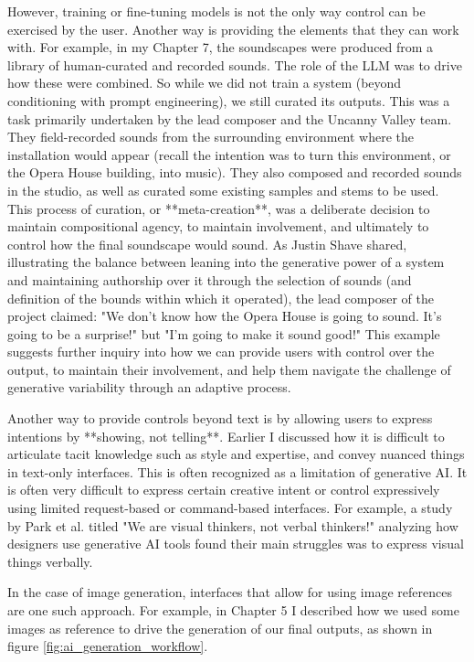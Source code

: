 However, training or fine-tuning models is not the only way control can be exercised by the user. Another way is providing the elements that they can work with. For example, in my Chapter 7, the soundscapes were produced from a library of human-curated and recorded sounds. The role of the LLM was to drive how these were combined. So while we did not train a system (beyond conditioning with prompt engineering), we still curated its outputs. This was a task primarily undertaken by the lead composer and the Uncanny Valley team. They field-recorded sounds from the surrounding environment where the installation would appear (recall the intention was to turn this environment, or the Opera House building, into music). They also composed and recorded sounds in the studio, as well as curated some existing samples and stems to be used. This process of curation, or **meta-creation**, was a deliberate decision to maintain compositional agency, to maintain involvement, and ultimately to control how the final soundscape would sound. As Justin Shave shared, illustrating the balance between leaning into the generative power of a system and maintaining authorship over it through the selection of sounds (and definition of the bounds within which it operated), the lead composer of the project claimed: "We don't know how the Opera House is going to sound. It's going to be a surprise!" but "I'm going to make it sound good!" This example suggests further inquiry into how we can provide users with control over the output, to maintain their involvement, and help them navigate the challenge of generative variability through an adaptive process.

Another way to provide controls beyond text is by allowing users to express intentions by **showing, not telling**. Earlier I discussed how it is difficult to articulate tacit knowledge such as style and expertise, and convey nuanced things in text-only interfaces. This is often recognized as a limitation of generative AI. It is often very difficult to express certain creative intent or control expressively using limited request-based or command-based interfaces. For example, a study by Park et al. \cite{Park2024-gw} titled "We are visual thinkers, not verbal thinkers!" analyzing how designers use generative AI tools found their main struggles was to express visual things verbally.

In the case of image generation, interfaces that allow for using image references are one such approach. For example, in Chapter 5 I described how we used some images as reference to drive the generation of our final outputs, as shown in figure \ref{fig:ai_generation_workflow}.

